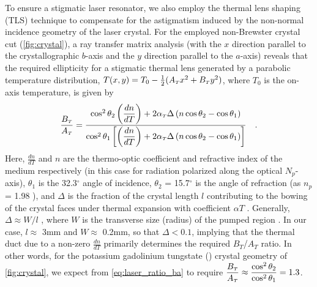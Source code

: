 To ensure a stigmatic laser resonator, we also employ the thermal lens shaping (TLS) technique \cite{Rimington_thermal_lens_2004} to compensate for the astigmatism induced by the non-normal incidence geometry of the laser crystal. 
For the employed non-Brewster crystal cut (\ref{fig:crystal}), a ray
transfer matrix analysis (with the $x$ direction parallel to the crystallographic $b$-axis and the $y$
direction parallel to the $a$-axis) reveals that the required ellipticity for a stigmatic thermal lens
generated by a parabolic temperature distribution, $T(x, y) = T_0 - \frac{1}{2} ( A_{{\scriptscriptstyle T}} x^2 + B_{{\scriptscriptstyle T}} y^2 )$, where $T_0$
is the on-axis temperature, is given by
\begin{equation} \label{eq:laser_ratio_ba}
  \frac{B_{{\scriptscriptstyle T}}}{A_{{\scriptscriptstyle T}}} = 
  \frac{ \cos^2 \theta_2 \left( \dfrac{dn}{dT} \right) + 2 \alpha_{{\scriptscriptstyle T}} \Delta \left( n \cos\theta_2 - \cos\theta_1 \right) }
       { \cos^2 \theta_1 \left[ \left( \dfrac{dn}{dT} \right) + 2 \alpha_{{\scriptscriptstyle T}} \Delta \left( n \cos\theta_2 - \cos\theta_1 \right) \right] }
  \quad\text{.}
\end{equation}
Here, $\frac{dn}{dT}$ and $n$ are the thermo-optic coefficient and refractive index of the medium respectively (in this case for radiation polarized along the optical $N_p$-axis), $\theta_1$ is the 32.3$^\circ$ angle of incidence, $\theta_2$ = 15.7$^\circ$ is the angle of refraction (as $n_p$ = 1.98 \cite{Biswal_thermo_optical_05,pujol_crystalline_1999}), and $\Delta$ is the fraction of the crystal length $l$ contributing to the bowing of the crystal faces under thermal
expansion with coefficient $\alpha T$ \cite{Rimington_thermal_lens_2004}.
Generally, $\Delta \approx W / l$ , where $W$ is the transverse size (radius) of the pumped region \cite{Koechner_thermal_1970}.
In our case, $l \approx$ 3mm and $W \approx$ 0.2mm, so that $\Delta < 0.1$, implying that the thermal duct due to a non-zero $\frac{dn}{dT}$ primarily determines the required $B_T$/$A_T$ ratio.
In other words, for the potassium gadolinium tungstate () crystal geometry of \ref{fig:crystal}, we expect from \ref{eq:laser_ratio_ba} to require $\dfrac{B_{{\scriptscriptstyle T}}}{A_{{\scriptscriptstyle T}}} \approx \dfrac{ \cos^2 \theta_2 }{ \cos^2 \theta_1 } = 1.3$.

